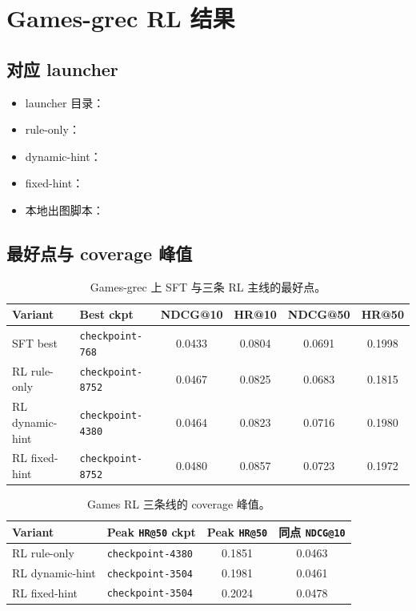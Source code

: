 \section{Games-grec RL 结果}

\subsection{对应 launcher}

{\footnotesize
\begin{itemize}
\item launcher 目录：
\item rule-only：
\item dynamic-hint：
\item fixed-hint：
\item 本地出图脚本：
\end{itemize}
}

\subsection{最好点与 coverage 峰值}

\begin{table}[H]
\centering
\small
\setlength{\tabcolsep}{4pt}
\begin{tabular}{p{2.7cm} p{2.4cm} c c c c}
\toprule
Variant & Best ckpt & NDCG@10 & HR@10 & NDCG@50 & HR@50 \\
\midrule
SFT best & \texttt{checkpoint-768} & 0.0433 & 0.0804 & 0.0691 & 0.1998 \\
RL rule-only & \texttt{checkpoint-8752} & 0.0467 & 0.0825 & 0.0683 & 0.1815 \\
RL dynamic-hint & \texttt{checkpoint-4380} & 0.0464 & 0.0823 & 0.0716 & 0.1980 \\
RL fixed-hint & \texttt{checkpoint-8752} & 0.0480 & 0.0857 & 0.0723 & 0.1972 \\
\bottomrule
\end{tabular}
\caption{Games-grec 上 SFT 与三条 RL 主线的最好点。}
\end{table}

\begin{table}[H]
\centering
\small
\setlength{\tabcolsep}{4pt}
\begin{tabular}{p{2.7cm} p{2.4cm} c c}
\toprule
Variant & Peak \texttt{HR@50} ckpt & Peak \texttt{HR@50} & 同点 \texttt{NDCG@10} \\
\midrule
RL rule-only & \texttt{checkpoint-4380} & 0.1851 & 0.0463 \\
RL dynamic-hint & \texttt{checkpoint-3504} & 0.1981 & 0.0461 \\
RL fixed-hint & \texttt{checkpoint-3504} & 0.2024 & 0.0478 \\
\bottomrule
\end{tabular}
\caption{Games RL 三条线的 coverage 峰值。}
\end{table}

